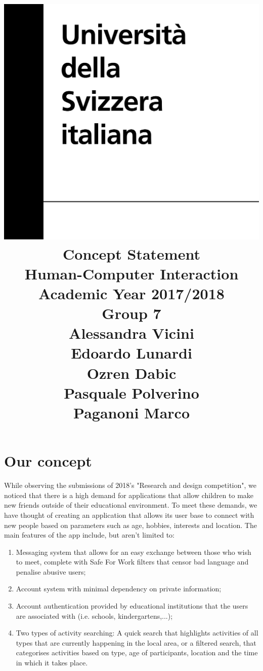 \documentclass[12pt]{article}
\title {
	\includegraphics[width = .2\linewidth]{University-of-Lugano.png} \break \break
	{\bf\Huge Concept Statement}
	\\\large Human-Computer Interaction
	\\\small Academic Year 2017/2018 \break
	\\\large \textbf{Group 7}
	\\\large Alessandra Vicini \\ Edoardo Lunardi \\ Ozren Dabic \\ Pasquale Polverino \\ Paganoni Marco}
\begin{document}
	
	\maketitle
	\newpage
	
	\part*{Our concept}
	While observing the submissions of 2018's "Research and design competition", we noticed that there is a high demand for applications that allow children to make new friends outside of their educational environment. To meet these demands, we have thought of creating an application that allows its user base to connect with new people based on parameters such as age, hobbies, interests and location. The main features of the app include, but aren't limited to:
	\begin{enumerate}
		\item Messaging system that allows for an easy exchange between those who wish to meet, complete with Safe For Work filters that censor bad language and penalise abusive users;
		\item Account system with minimal dependency on private information;
		\item Account authentication provided by educational institutions that the users are associated with (i.e. schools, kindergartens,...);
		\item Two types of activity searching: A quick search that highlights activities of all types that are currently happening in the local area, or a filtered search, that categorises activities based on type, age of participants, location and the time in which it takes place. 
	\end{enumerate}
	
	
\end{document}
